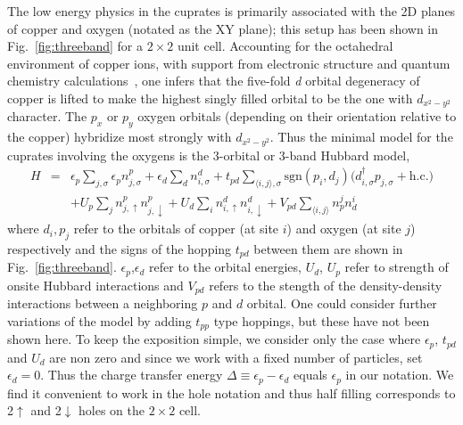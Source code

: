 \documentclass[prl,12pt,onecolumn,nofootinbib,notitlepage,english,superscriptaddress]{revtex4-1}
\begin{document}
The low energy physics in the cuprates is primarily associated with the 2D planes of copper and oxygen (notated 
as the XY plane); this setup has been shown in Fig.~\ref{fig:threeband} for a $2 \times 2$ unit cell.
Accounting for the octahedral environment of copper ions, with support from electronic structure 
and quantum chemistry calculations~\cite{Dagotto_RevModPhys}, one infers 
that the five-fold \emph{d} orbital degeneracy of copper is lifted to make the 
highest singly filled orbital to be the one with $d_{x^2-y^2}$ character. 
The $p_x$ or $p_y$ oxygen orbitals (depending on their orientation relative to the copper) 
hybridize most strongly with $d_{x^2-y^2}$. Thus the minimal model for the cuprates involving the oxygens 
is the 3-orbital or 3-band Hubbard model, 
\begin{eqnarray}
H &=&    \epsilon_p \sum_{j,\sigma} \epsilon_p n^{p}_{j,\sigma} + \epsilon_{d} \sum_{d}  n^{d}_{i,\sigma} 
	+ t_{pd} \sum_{\langle i,j \rangle, \sigma} \text{sgn}(p_i,d_j) \Big( d_{i,\sigma}^{\dagger} p_{j,\sigma} + \text{h.c.} \Big) \\
  & &   + U_p \sum_{j} n^{p}_{j,\uparrow} n^{p}_{j,\downarrow} + U_d \sum_{i} n^{d}_{i,\uparrow} n^{d}_{i,\downarrow} + V_{pd} \sum_{\langle i,j \rangle} n^{j}_p n^{i}_d 
\end{eqnarray}
where $d_i,p_j$ refer to the orbitals of copper (at site $i$) and oxygen (at site $j$)  respectively 
and the signs of the hopping $t_{pd}$ between them are shown in Fig.~\ref{fig:threeband}. 
$\epsilon_p$,$\epsilon_d$ refer to the orbital energies, 
$U_d$, $U_p$ refer to strength of onsite Hubbard interactions and $V_{pd}$ refers to the 
stength of the density-density interactions between a neighboring $p$ and $d$ orbital. 
One could consider further variations of the model by adding $t_{pp}$ type hoppings, but 
these have not been shown here. To keep the exposition simple, we consider only 
the case where $\epsilon_p$, $t_{pd}$ and $U_{d}$ are non zero and 
since we work with a fixed number of particles, set $\epsilon_d = 0$. Thus the 
charge transfer energy $\Delta \equiv \epsilon_p - \epsilon_d$ equals $\epsilon_p$ in our notation. 
We find it convenient to work in the hole notation and thus half filling corresponds to 2$\uparrow$ and 2$\downarrow$ 
holes on the $2\times2$ cell.
\end{document}

